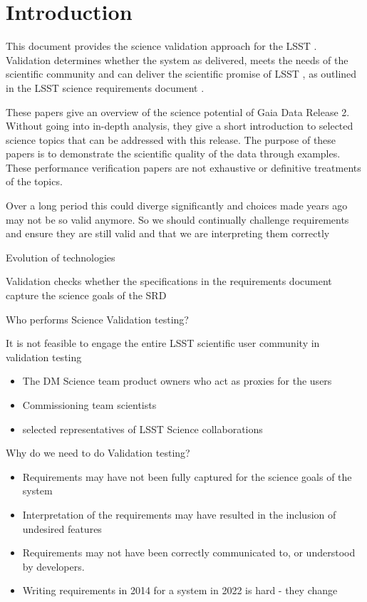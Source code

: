 \section{Introduction}  \label{sec:intro}


This document provides the  science validation approach for the  LSST  .   Validation   determines whether the system 
as delivered, meets the needs of the scientific community and can deliver the scientific promise of  LSST , as outlined in 
the  LSST   science requirements document . 

These papers give an overview of the science potential of Gaia  Data Release   2. Without going into in-depth analysis, they give a short introduction to selected science topics that can be addressed with this release. The purpose of these papers is to demonstrate the scientific quality of the data through examples. These performance verification papers are not exhaustive or definitive treatments of the topics.

Over a long period this could diverge significantly and choices made years ago may not be so valid anymore. So we should continually
challenge requirements and ensure they are still valid and that we are interpreting them correctly

Evolution of technologies 

Validation checks  whether the specifications in the requirements document capture the science goals of the  SRD  

Who performs Science  Validation   testing?

It is not feasible to engage the entire  LSST   scientific user community in validation testing
\begin{itemize}
\item The  DM  Science team product owners who act as proxies for the users
\item Commissioning   team scientists 
\item selected representatives of  LSST   Science collaborations 
\end{itemize}

Why do we need to do  Validation   testing?
\begin{itemize}
\item Requirements may have not been fully captured for the science goals of the system 
\item Interpretation of the requirements may have resulted in the inclusion of undesired features 
\item Requirements may not have been correctly communicated to, or understood by developers. 
\item Writing requirements in 2014 for a system in 2022 is hard - they change 
\end{itemize}

